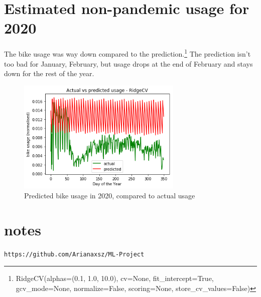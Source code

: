 \documentclass[12pt,letterpaper]{article}
\begin{document}

\section{Estimated non-pandemic usage for 2020}

The bike usage was way down compared to the prediction.\footnote{RidgeCV(alphas=(0.1, 1.0, 10.0), cv=None, fit\_intercept=True, gcv\_mode=None, normalize=False, scoring=None, store\_cv\_values=False)}  
The prediction isn't too bad for January, February, but usage drops at the end of February and stays down for the rest of the year.
\begin{figure}[!htbp]
	\includegraphics[width=0.7\textwidth]{../graphs/pred_2020.png}
	\caption{Predicted bike usage in 2020, compared to actual usage}
	\label{fig:surface}
\end{figure}



\section*{notes}
\texttt{https://github.com/Arianaxsz/ML-Project}
\end{document}
